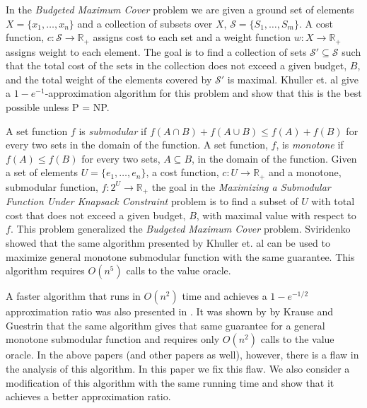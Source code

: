 In the \emph{Budgeted Maximum Cover} problem we are given a ground set of elements 
$X = \{x_1, \dots, x_n\}$ and a collection of subsets over $X$, 
$\mathcal{S} = \{S_1, \dots, S_m\}$.
A cost function, $c:\mathcal{S} \to \mathbb{R}_+$ assigns cost to each set 
and a weight function $w:X \to \mathbb{R}_+$ assigns weight to each element. 
The goal is to find a collection of sets $\mathcal{S'} \subseteq \mathcal{S}$ such that the 
total cost of the sets in the collection does not exceed a given budget, $B$, and the 
total weight of the elements covered by $\mathcal{S'}$ is maximal.
Khuller et. al \cite{khuller1999budgeted} 
give a $1-e^{-1}$-approximation algorithm for this problem and show that this is
the best possible unless P = NP.   

A set function $f$ is \emph{submodular} if $f(A \cap B) + f(A \cup B) \leq f(A) + f(B)$ 
for every two sets in the domain of the function. A set function, $f$, is \emph{monotone} if 
$f(A) \leq f(B)$ for every two sets, $A \subseteq B$, in the domain of the function.
Given a set of elements $U = \{e_1, \dots, e_n\}$, a cost function, 
$c:U \to \mathbb{R}_+$ and a monotone, submodular function, $f:2^U \to \mathbb{R}_+$ 
the goal in the \emph{Maximizing a Submodular Function Under
Knapsack Constraint} problem is to find a subset of $U$ with total cost that does not exceed
a given budget, $B$, with maximal value with respect to $f$.
This problem generalized the \emph{Budgeted Maximum Cover} problem. 
Sviridenko \cite{sviridenko2004note} showed that the same algorithm presented by 
Khuller et. al can be used to maximize general monotone submodular function 
with the same guarantee.
This algorithm requires $O(n^5)$ calls to the value oracle. 

A faster algorithm that runs in $O(n^2)$ time and achieves a $1 - e^{-1/2}$ approximation ratio
was also presented in \cite{khuller1999budgeted}. 
It was shown by by Krause and Guestrin \cite{krause2005note} that the same algorithm 
gives that same guarantee for a general monotone submodular function and requires only 
$O(n^2)$ calls to the value oracle.
In the above papers (and other papers as well), however, there is a flaw in the analysis of this
algorithm. 
In this paper we fix this flaw. 
We also consider a modification of this algorithm with the same running time and show that it
achieves a better approximation ratio.   